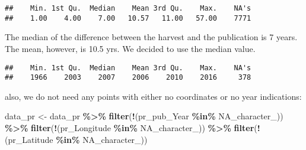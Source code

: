 \documentclass[
]{article}
\newenvironment{Shaded}{\begin{snugshade}}{\end{snugshade}}
\newcommand{\AttributeTok}[1]{\textcolor[rgb]{0.13,0.29,0.53}{#1}}
\newcommand{\ConstantTok}[1]{\textcolor[rgb]{0.56,0.35,0.01}{#1}}
\newcommand{\DecValTok}[1]{\textcolor[rgb]{0.00,0.00,0.81}{#1}}
\newcommand{\FunctionTok}[1]{\textcolor[rgb]{0.13,0.29,0.53}{\textbf{#1}}}
\newcommand{\NormalTok}[1]{#1}
\newcommand{\OtherTok}[1]{\textcolor[rgb]{0.56,0.35,0.01}{#1}}
\newcommand{\SpecialCharTok}[1]{\textcolor[rgb]{0.81,0.36,0.00}{\textbf{#1}}}
\begin{document}
\begin{Shaded}
\end{Shaded}

\begin{verbatim}
##    Min. 1st Qu.  Median    Mean 3rd Qu.    Max.    NA's 
##    1.00    4.00    7.00   10.57   11.00   57.00    7771
\end{verbatim}

The median of the difference between the harvest and the publication is
7 years. The mean, however, is 10.5 yrs. We decided to use the median
value.

\begin{Shaded}
\end{Shaded}

\begin{verbatim}
##    Min. 1st Qu.  Median    Mean 3rd Qu.    Max.    NA's 
##    1966    2003    2007    2006    2010    2016     378
\end{verbatim}

also, we do not need any points with either no coordinates or no year
indications:

\begin{Shaded}
\begin{Highlighting}[]
\NormalTok{data\_pr }\OtherTok{\textless{}{-}} 
\NormalTok{data\_pr }\SpecialCharTok{\%\textgreater{}\%} 
  \FunctionTok{filter}\NormalTok{(}\SpecialCharTok{!}\NormalTok{(pr\_pub\_Year }\SpecialCharTok{\%in\%} \ConstantTok{NA\_character\_}\NormalTok{)) }\SpecialCharTok{\%\textgreater{}\%} 
  \FunctionTok{filter}\NormalTok{(}\SpecialCharTok{!}\NormalTok{(pr\_Longitude }\SpecialCharTok{\%in\%} \ConstantTok{NA\_character\_}\NormalTok{)) }\SpecialCharTok{\%\textgreater{}\%} 
   \FunctionTok{filter}\NormalTok{(}\SpecialCharTok{!}\NormalTok{(pr\_Latitude }\SpecialCharTok{\%in\%} \ConstantTok{NA\_character\_}\NormalTok{)) }
\end{Highlighting}
\end{Shaded}
\end{document}
